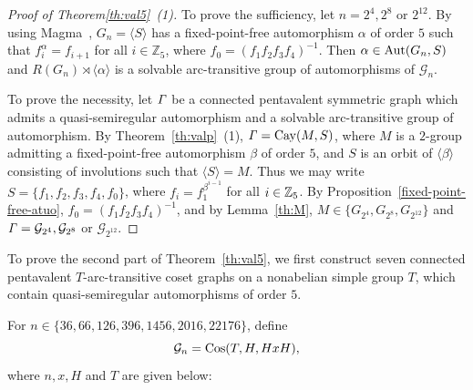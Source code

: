 \documentclass[12pt,reqno]{amsart}
\renewcommand\a{\alpha}  \renewcommand\b{\beta}
\newcommand\mz{\mathbb{Z}}
\newcommand{\cG}{\mathcal{G}}
\numberwithin {equation} {section}
\begin{document}
 \medskip

\begin{proof}[Proof of Theorem\ref{th:val5}~{\rm (1)}]   To prove the sufficiency, let $n=2^4,2^8$ or $2^{12}$. By using  {\sc Magma}~\cite{Magma}, $G_n=\langle S\rangle$ has a fixed-point-free automorphism $\a$ of order $5$ such that $f_i^\a=f_{i+1}$ for all $i\in\mz_5$, where  $f_0= (f_1f_2f_3f_4)^{-1}$. Then $\a\in \Aut(G_n,S)$ and $R(G_n)\rtimes\langle \a\rangle$ is a solvable  arc-transitive group of automorphisms of $\cG_n$.

To prove the necessity, let ${\it \Gamma}$ be a connected pentavalent symmetric graph which admits a quasi-semiregular automorphism and  a solvable arc-transitive group of automorphism.  By  Theorem~\ref{th:valp}~(1), ${\it \Gamma}=\mathrm{Cay}(M,S)$, where $M$ is a $2$-group admitting a fixed-point-free automorphism $\beta$ of order $5$, and $S$ is an orbit of $\langle \beta \rangle$ consisting of involutions such that $\langle S \rangle=M$. Thus we may write $S=\{f_1,f_2,f_3,f_4,f_0\}$, where $f_i=f_1^{\beta^{i-1}}$ for all $i \in \mathbb{Z}_5$. By Proposition~\ref{fixed-point-free-atuo},  $f_0=(f_1f_2f_3f_4)^{-1}$, and by Lemma~\ref{th:M}, $M \in \{G_{2^4}, G_{2^8},G_{2^{12}}\}$ and $\Ga=\cG_{2^4},\cG_{2^8}$ or $\cG_{2^{12}}$.
\end{proof}

To prove the second part of Theorem~\ref{th:val5}, we first construct seven connected pentavalent $T$-arc-transitive coset graphs on a nonabelian simple group $T$, which contain quasi-semiregular automorphisms of order $5$.

For $n  \in \{ 36,66,126,396,1456,2016,22176\}$, define
\begin{equation}\label{eq:eq7}
\cG_n=\Cos(T, H, HxH),
\end{equation}
where $n,x,H$ and $T$ are given below:

\medskip
\end{document}
